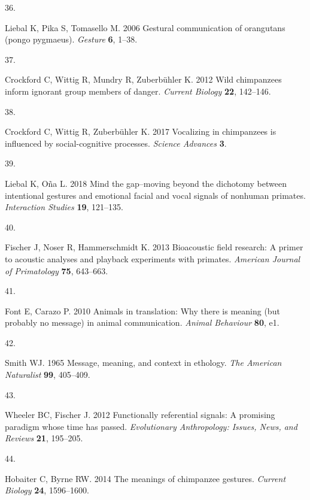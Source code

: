 \documentclass[
  man,floatsintext]{apa6}
\newlength{\cslhangindent}
\newlength{\csllabelwidth}
\newlength{\cslentryspacingunit} %
\newenvironment{CSLReferences}[2] %
 {%
  \setlength{\parindent}{0pt}
  \ifodd #1
  \let\oldpar\par
  \def\par{\hangindent=\cslhangindent\oldpar}
  \fi
  \setlength{\parskip}{#2\cslentryspacingunit}
 }%
 {}
\newcommand{\CSLLeftMargin}[1]{\parbox[t]{\csllabelwidth}{#1}}
\newcommand{\CSLRightInline}[1]{\parbox[t]{\linewidth - \csllabelwidth}{#1}\break}
\begin{document}
\begin{CSLReferences}{0}{0}
\leavevmode{}%
\CSLLeftMargin{36. }
\CSLRightInline{Liebal K, Pika S, Tomasello M. 2006 Gestural communication of orangutans (pongo pygmaeus). \emph{Gesture} \textbf{6}, 1--38.}

\leavevmode{}%
\CSLLeftMargin{37. }
\CSLRightInline{Crockford C, Wittig R, Mundry R, Zuberbühler K. 2012 Wild chimpanzees inform ignorant group members of danger. \emph{Current Biology} \textbf{22}, 142--146.}

\leavevmode{}%
\CSLLeftMargin{38. }
\CSLRightInline{Crockford C, Wittig R, Zuberbühler K. 2017 Vocalizing in chimpanzees is influenced by social-cognitive processes. \emph{Science Advances} \textbf{3}.}

\leavevmode{}%
\CSLLeftMargin{39. }
\CSLRightInline{Liebal K, Oña L. 2018 Mind the gap--moving beyond the dichotomy between intentional gestures and emotional facial and vocal signals of nonhuman primates. \emph{Interaction Studies} \textbf{19}, 121--135.}

\leavevmode{}%
\CSLLeftMargin{40. }
\CSLRightInline{Fischer J, Noser R, Hammerschmidt K. 2013 Bioacoustic field research: A primer to acoustic analyses and playback experiments with primates. \emph{American Journal of Primatology} \textbf{75}, 643--663.}

\leavevmode{}%
\CSLLeftMargin{41. }
\CSLRightInline{Font E, Carazo P. 2010 Animals in translation: Why there is meaning (but probably no message) in animal communication. \emph{Animal Behaviour} \textbf{80}, e1.}

\leavevmode{}%
\CSLLeftMargin{42. }
\CSLRightInline{Smith WJ. 1965 Message, meaning, and context in ethology. \emph{The American Naturalist} \textbf{99}, 405--409.}

\leavevmode{}%
\CSLLeftMargin{43. }
\CSLRightInline{Wheeler BC, Fischer J. 2012 Functionally referential signals: A promising paradigm whose time has passed. \emph{Evolutionary Anthropology: Issues, News, and Reviews} \textbf{21}, 195--205.}

\leavevmode{}%
\CSLLeftMargin{44. }
\CSLRightInline{Hobaiter C, Byrne RW. 2014 The meanings of chimpanzee gestures. \emph{Current Biology} \textbf{24}, 1596--1600.}


\end{CSLReferences}
\end{document}
